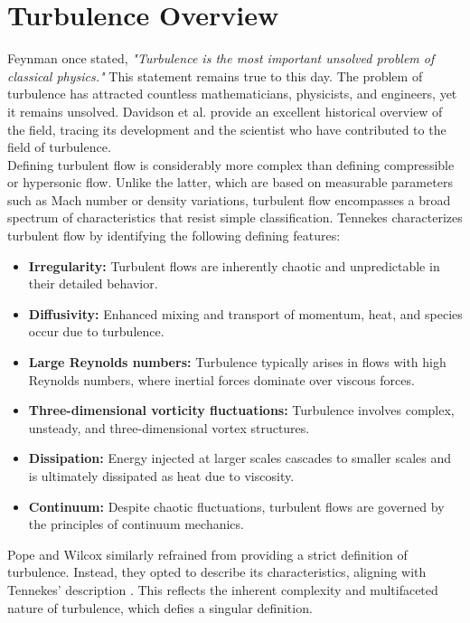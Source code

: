 \section{Turbulence Overview\label{ch2:turbulenceOverview}}

Feynman once stated, \textit{"Turbulence is the most important unsolved problem of
classical physics."} This statement remains true to this day. The problem of
turbulence has attracted countless mathematicians, physicists, and engineers,
yet it remains unsolved. Davidson et al. \cite{Davidson2011} provide an
excellent historical overview of the field, tracing its development and the
scientist who have contributed to the field of turbulence.  \\

Defining turbulent flow is considerably more complex than defining compressible
or hypersonic flow. Unlike the latter, which are based on measurable parameters
such as Mach number or density variations, turbulent flow encompasses a broad
spectrum of characteristics that resist simple classification. Tennekes
\cite{Tennekes1972} characterizes turbulent flow by identifying the following
defining features:
\begin{itemize}
    \item \textbf{Irregularity:} Turbulent flows are inherently chaotic and
        unpredictable in their detailed behavior.
    \item \textbf{Diffusivity:} Enhanced mixing and transport of momentum,
        heat, and species occur due to turbulence.
    \item \textbf{Large Reynolds numbers:} Turbulence typically arises in flows
        with high Reynolds numbers, where inertial forces dominate over viscous
        forces.
    \item \textbf{Three-dimensional vorticity fluctuations:} Turbulence
        involves complex, unsteady, and three-dimensional vortex structures.
    \item \textbf{Dissipation:} Energy injected at larger scales cascades to
        smaller scales and is ultimately dissipated as heat due to viscosity.
    \item \textbf{Continuum:} Despite chaotic fluctuations, turbulent flows are
        governed by the principles of continuum mechanics.
\end{itemize}

Pope \cite{Pope2000} and Wilcox \cite{Wilcox1998} similarly refrained from
providing a strict definition of turbulence. Instead, they opted to describe
its characteristics, aligning with Tennekes’ description \cite{Tennekes1972}. This
reflects the inherent complexity and multifaceted nature of turbulence, which
defies a singular definition. \\

